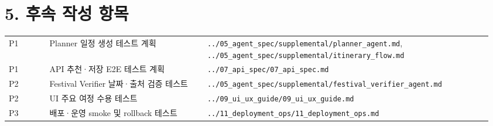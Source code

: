 \documentclass[12pt,a4paper]{article}
\newcommand{\DocNeedspace}[1]{\par\ifdim\dimexpr\pagegoal-\pagetotal\relax<#1\newpage\fi}
\renewcommand{\arraystretch}{1.35}
\newcommand{\TocNoChildTight}{\vspace{-0.28em}}
\begin{document}
\newpage

\DocNeedspace{10\baselineskip}
\section*{5. 후속 작성 항목}
\addtocontents{toc}{\protect\TocNoChildTight}


\DocNeedspace{16\baselineskip}
\begin{small}
\setlength{\tabcolsep}{3pt}
\setlength{\extrarowheight}{1pt}
\renewcommand{\arraystretch}{1.42}
\begin{longtable}{@{}>{\RaggedRight\arraybackslash}m{0.080\linewidth}>{\RaggedRight\arraybackslash}m{0.314\linewidth}>{\RaggedRight\arraybackslash}m{0.565\linewidth}@{}}
\toprule
\multicolumn{1}{>{\centering\arraybackslash}m{0.080\linewidth}}{\textbf{우선순위}} & \multicolumn{1}{>{\centering\arraybackslash}m{0.314\linewidth}}{\textbf{항목}} & \multicolumn{1}{>{\centering\arraybackslash}m{0.565\linewidth}}{\textbf{기준 문서}} \\
\midrule
\endhead
P1 & Planner 일정 생성 테스트 계획 & \texttt{.\allowbreak{}.\allowbreak{}/\allowbreak{}05\_\allowbreak{}agent\_\allowbreak{}spec/\allowbreak{}supplemental/\allowbreak{}planner\_\allowbreak{}agent.\allowbreak{}md}, \texttt{.\allowbreak{}.\allowbreak{}/\allowbreak{}05\_\allowbreak{}agent\_\allowbreak{}spec/\allowbreak{}supplemental/\allowbreak{}itinerary\_\allowbreak{}flow.\allowbreak{}md} \\
P1 & API 추천·저장 E2E 테스트 계획 & \texttt{.\allowbreak{}.\allowbreak{}/\allowbreak{}07\_\allowbreak{}api\_\allowbreak{}spec/\allowbreak{}07\_\allowbreak{}api\_\allowbreak{}spec.\allowbreak{}md} \\
P2 & Festival Verifier 날짜·출처 검증 테스트 & \texttt{.\allowbreak{}.\allowbreak{}/\allowbreak{}05\_\allowbreak{}agent\_\allowbreak{}spec/\allowbreak{}supplemental/\allowbreak{}festival\_\allowbreak{}verifier\_\allowbreak{}agent.\allowbreak{}md} \\
P2 & UI 주요 여정 수용 테스트 & \texttt{.\allowbreak{}.\allowbreak{}/\allowbreak{}09\_\allowbreak{}ui\_\allowbreak{}ux\_\allowbreak{}guide/\allowbreak{}09\_\allowbreak{}ui\_\allowbreak{}ux\_\allowbreak{}guide.\allowbreak{}md} \\
P3 & 배포·운영 smoke 및 rollback 테스트 & \texttt{.\allowbreak{}.\allowbreak{}/\allowbreak{}11\_\allowbreak{}deployment\_\allowbreak{}ops/\allowbreak{}11\_\allowbreak{}deployment\_\allowbreak{}ops.\allowbreak{}md} \\
\bottomrule
\end{longtable}
\end{small}
\end{document}
